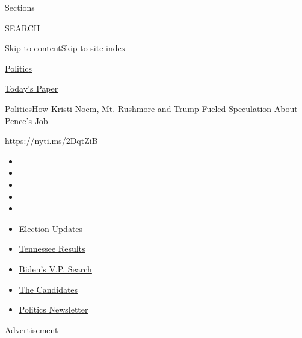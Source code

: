 Sections

SEARCH

\protect\hyperlink{site-content}{Skip to
content}\protect\hyperlink{site-index}{Skip to site index}

\href{https://www.nytimes.com/section/politics}{Politics}

\href{https://myaccount.nytimes.com/auth/login?response_type=cookie\&client_id=vi}{}

\href{https://www.nytimes.com/section/todayspaper}{Today's Paper}

\href{/section/politics}{Politics}\textbar{}How Kristi Noem, Mt.
Rushmore and Trump Fueled Speculation About Pence's Job

\href{https://nyti.ms/2DqtZiB}{https://nyti.ms/2DqtZiB}

\begin{itemize}
\item
\item
\item
\item
\item
\end{itemize}

\begin{itemize}
\item
  \href{https://www.nytimes.com/2020/08/07/us/elections/biden-vs-trump.html?action=click\&pgtype=Article\&state=default\&region=TOP_BANNER\&context=storylines_menu}{Election
  Updates}
\item
  \href{https://www.nytimes.com/interactive/2020/08/06/us/elections/results-tennessee-primary-elections.html?action=click\&pgtype=Article\&state=default\&region=TOP_BANNER\&context=storylines_menu}{Tennessee
  Results}
\item
  \href{https://www.nytimes.com/article/biden-vice-president-2020.html?action=click\&pgtype=Article\&state=default\&region=TOP_BANNER\&context=storylines_menu}{Biden's
  V.P. Search}
\item
  \href{https://www.nytimes.com/interactive/2019/us/politics/2020-presidential-candidates.html?action=click\&pgtype=Article\&state=default\&region=TOP_BANNER\&context=storylines_menu}{The
  Candidates}
\item
  \href{https://www.nytimes.com/newsletters/politics?action=click\&pgtype=Article\&state=default\&region=TOP_BANNER\&context=storylines_menu}{Politics
  Newsletter}
\end{itemize}

Advertisement


